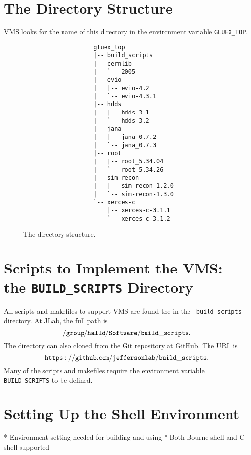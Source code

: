 \documentclass[12pt]{article}
\begin{document}
\section{The Directory Structure}\label{section:directory}

VMS looks for the name of this directory in the environment variable {\tt GLUEX\_TOP}.

\begin{figure}
\begin{verbatim}
                    gluex_top
                    |-- build_scripts
                    |-- cernlib
                    |   `-- 2005
                    |-- evio
                    |   |-- evio-4.2
                    |   `-- evio-4.3.1
                    |-- hdds
                    |   |-- hdds-3.1
                    |   `-- hdds-3.2
                    |-- jana
                    |   |-- jana_0.7.2
                    |   `-- jana_0.7.3
                    |-- root
                    |   |-- root_5.34.04
                    |   `-- root_5.34.26
                    |-- sim-recon
                    |   |-- sim-recon-1.2.0
                    |   `-- sim-recon-1.3.0
                    `-- xerces-c
                        |-- xerces-c-3.1.1
                        `-- xerces-c-3.1.2
\end{verbatim}
\caption{The directory structure.}\label{fig:directory-tree}
\end{figure}

\section{Scripts to Implement the VMS: \\ the {\tt BUILD\_SCRIPTS} Directory}

All scripts and makefiles to support VMS are found the in the {\tt
  build\_scripts} directory. At JLab, the full path is
$${\tt /group/halld/Software/build\_scripts}.$$
The directory can also cloned from the Git repository at GitHub. The URL is
$${\tt https://github.com/jeffersonlab/build\_scripts}.$$
Many of the scripts and makefiles require the environment variable {\tt BUILD\_SCRIPTS} to be defined.


\section{Setting Up the Shell Environment}

* Environment setting needed for building and using
* Both Bourne shell and C shell supported
\end{document}

